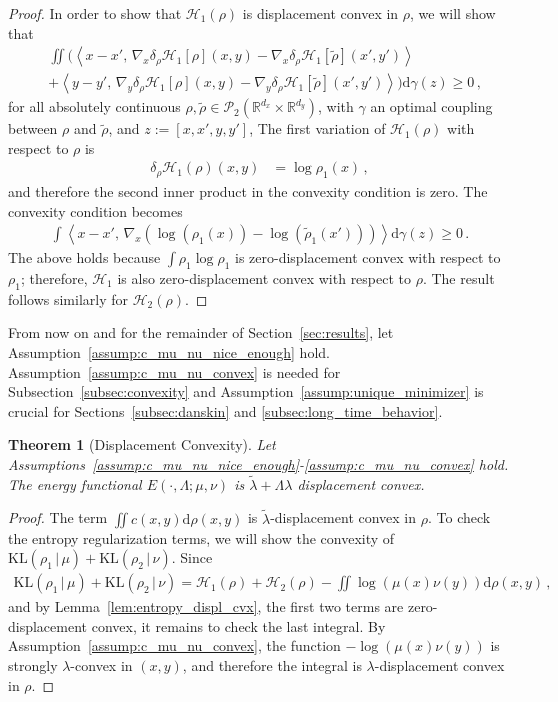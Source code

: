 \documentclass[11pt,a4paper,final]{article}
\newcommand{\KL}[2]{\text{KL}(#1\,|\,#2)}
\def\Hc{\mathcal H}
\def\P{\mathcal P}
\def\R{\mathbb R}
\renewcommand{\d}{\mathrm{d}}
\newcommand{\1}{\mathbf{1}}
\def\<#1,#2>{\left\langle #1,\,#2\right\rangle}
\theoremstyle{plain}
\newtheorem{theorem}{Theorem}
\numberwithin{equation}{section}
\numberwithin{theorem}{section}
\begin{document}
\begin{proof}
In order to show that $\Hc_1(\rho)$ is displacement convex in $\rho$, we will show that 
\begin{align*}
    &\iint\bigg( \<x-x',\nabla_x \delta_\rho \Hc_1[\rho](x,y) - \nabla_x \delta_\rho \Hc_1[\tilde \rho](x',y')>
    \\
    &
    + \<y-y',\nabla_y \delta_\rho \Hc_1[\rho](x,y) - \nabla_y \delta_\rho \Hc_1[\tilde \rho](x',y')>\bigg) \d \gamma(z)\ge 0\,,
\end{align*}
 for all absolutely continuous $\rho,\tilde \rho \in \P_2(\R^{d_x}\times \R^{d_y})$, 
  with $\gamma$ an optimal coupling between $\rho$ and $\tilde \rho$, and $z:=[x,x',y,y']$,
The first variation of $\Hc_1(\rho)$ with respect to $\rho$ is 
    \begin{align*}
        \delta_\rho \Hc_1(\rho)(x,y) &=\log \rho_1(x)\,,
    \end{align*}
and therefore the second inner product in the convexity condition is zero. The convexity condition becomes
    \begin{align*}
        \int \<x-x',\nabla_x (\log(\rho_1(x)) - \log(\tilde \rho_1(x')))> \d \gamma(z) \ge 0\,.    
    \end{align*}
The above holds because $\int\rho_1\log\rho_1$ is zero-displacement convex with respect to $\rho_1$; therefore, $\Hc_1$ is also zero-displacement convex with respect to $\rho$. The result follows similarly for $\Hc_2(\rho)$.
\end{proof}
From now on and for the remainder of Section~\ref{sec:results}, let Assumption~\ref{assump:c_mu_nu_nice_enough} hold. Assumption~\ref{assump:c_mu_nu_convex} is needed for Subsection~\ref{subsec:convexity} and Assumption~\ref{assump:unique_minimizer} is crucial for Sections~\ref{subsec:danskin} and \ref{subsec:long_time_behavior}.
\begin{theorem}[Displacement Convexity]\label{thm:displacement_convexity_E}
 Let Assumptions~\ref{assump:c_mu_nu_nice_enough}-\ref{assump:c_mu_nu_convex} hold. The energy functional $E(\cdot,\Lambda;\mu,\nu)$ is $\tilde \lambda + \Lambda \lambda$ displacement convex. 
\end{theorem}
\begin{proof}
    The term $\iint c(x,y) \d \rho(x,y)$ is $\tilde \lambda$-displacement convex in $\rho$. To check the entropy regularization terms, we will show the convexity of $\KL{\rho_1}{\mu}+\KL{\rho_2}{\nu}$. Since
    \begin{align*}
       \KL{\rho_1}{\mu}+\KL{\rho_2}{\nu} = \Hc_1(\rho)+\Hc_2(\rho)
       -\iint  \log( \mu(x)\nu(y)) \d \rho(x,y) \,,
    \end{align*} and by Lemma~\ref{lem:entropy_displ_cvx}, the first two terms are zero-displacement convex, it remains to check the last integral. By Assumption~\ref{assump:c_mu_nu_convex}, the function $-\log( \mu(x)\nu(y))$ is strongly $\lambda$-convex in $(x,y)$, and therefore the integral is $\lambda$-displacement convex in $\rho$.
\end{proof}
\end{document}
